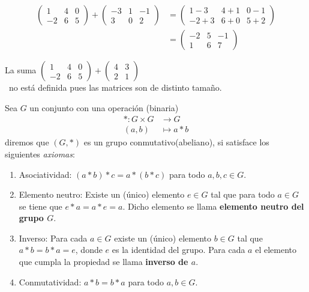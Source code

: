 \begin{ejem}
\begin{align*}
    \begin{pmatrix} 1 & 4 & 0 \\ -2 & 6 & 5 \end{pmatrix} + \begin{pmatrix} -3 & 1 & -1 \\ 3 & 0 & 2 \end{pmatrix} &= \begin{pmatrix} 1-3 & 4+1 & 0 -1 \\ -2+3 & 6 + 0 & 5+2 \end{pmatrix}\\
&= \begin{pmatrix} -2 & 5 & -1 \\ 1 & 6 & 7 \end{pmatrix}
\end{align*}
\end{ejem}

\begin{rmk}
La suma $\begin{pmatrix} 1 & 4 & 0 \\ -2 & 6 & 5 \end{pmatrix} + \begin{pmatrix} 4 & 3 \\ 2 & 1 \end{pmatrix} $ 
\\\
no está definida pues las matrices son de distinto tamaño.
\end{rmk}

\begin{defin}
Sea $G$ un conjunto con una operaci\'on (binaria)
\begin{align*}
* \colon G\times G &\to G \\
(a,b) &\mapsto a*b
\end{align*}
diremos que $(G,*)$ es un grupo conmutativo(abeliano), si satisface los siguientes \textit{axiomas}:
\begin{enumerate}
    \item Asociatividad: $(a*b)*c=a*(b*c)$ para todo $a,b,c\in G$.
    \item Elemento neutro: Existe un (\'unico) elemento $e\in G$ tal que para todo $a\in G$ se tiene que $e*a=a*e=a$. Dicho elemento se llama \textbf{elemento neutro del grupo $G$}.
    \item Inverso: Para cada $a\in G$ existe un (\'unico) elemento $b\in G$ tal que $a*b=b*a=e$, donde $e$ es la identidad del grupo. Para cada $a$ el elemento que cumpla la propiedad se llama \textbf{inverso de $a$}.
    \item Conmutatividad: $a*b=b*a$ para todo $a,b\in G$.
\end{enumerate}
\end{defin}

